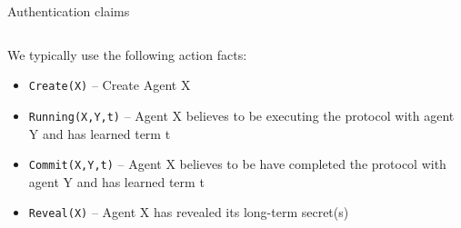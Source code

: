 \documentclass[11pt,aspectratio=169]{beamer}
\begin{document}
\begin{frame}[fragile]{Authentication claims}
    \begin{columns}[T]
        \begin{column}{.65\textwidth}
            We typically use the following action facts:
            \begin{itemize}
                \item \texttt{Create(X)} -- Create Agent X
                \item \texttt{Running(X,Y,t)} -- Agent X believes to be 
                      executing the protocol with agent Y and has learned term t
                \item \texttt{Commit(X,Y,t)} -- Agent X believes to be have 
                      completed the protocol with agent Y and has learned term t
                \item \texttt{Reveal(X)} -- Agent X has revealed its long-term 
                      secret(s)
            \end{itemize}
        \end{column}
\end{columns}
\end{frame}
\end{document}

